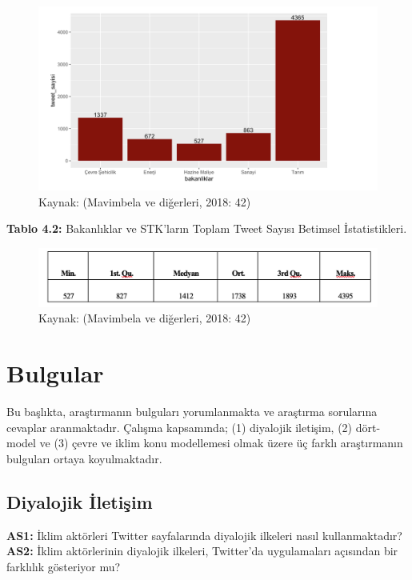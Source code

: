 \documentclass[
]{book}
\begin{document}
\begin{figure}
\includegraphics[width=0.95\linewidth,height=0.95\textheight]{tablolar-sekiller/sekil-4-4} \caption{Kaynak: (Mavimbela ve diğerleri, 2018: 42)}\label{fig:unnamed-chunk-5}
\end{figure}

\textbf{Tablo 4.2:} Bakanlıklar ve STK'ların Toplam Tweet Sayısı Betimsel İstatistikleri.

\begin{figure}
\includegraphics[width=0.95\linewidth,height=0.95\textheight]{tablolar-sekiller/tablo-4-2} \caption{Kaynak: (Mavimbela ve diğerleri, 2018: 42)}\label{fig:unnamed-chunk-6}
\end{figure}

\hypertarget{bulgular}{%
\section{Bulgular}\label{bulgular}}

Bu başlıkta, araştırmanın bulguları yorumlanmakta ve araştırma sorularına cevaplar aranmaktadır. Çalışma kapsamında; (1) diyalojik iletişim, (2) dört-model ve (3) çevre ve iklim konu modellemesi olmak üzere üç farklı araştırmanın bulguları ortaya koyulmaktadır.

\hypertarget{diyalojik-iletiux15fim}{%
\subsection{Diyalojik İletişim}\label{diyalojik-iletiux15fim}}

\textbf{AS1:} İklim aktörleri Twitter sayfalarında diyalojik ilkeleri nasıl kullanmaktadır?
\textbf{AS2:} İklim aktörlerinin diyalojik ilkeleri, Twitter'da uygulamaları açısından bir farklılık gösteriyor mu?
\end{document}
